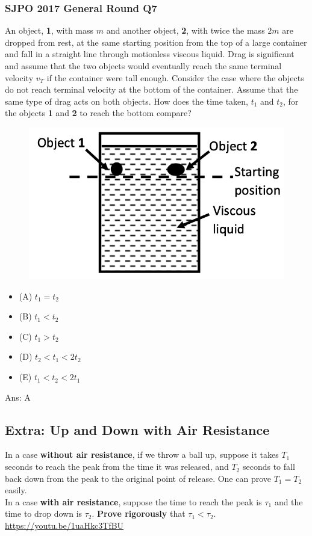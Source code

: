 \documentclass{article}
\begin{document}
\subsubsection{SJPO 2017 General Round Q7}
An object, \textbf{1}, with mass $m$ and another object, \textbf{2}, with twice the mass $2 m$ are dropped from rest, at the same starting position from the top of a large container and fall in a straight line through motionless viscous liquid. Drag is significant and assume that the two objects would eventually reach the same terminal velocity $v_T$ if the container were tall enough. Consider the case where the objects do not reach terminal velocity at the bottom of the container. Assume that the same type of drag acts on both objects. How does the time taken, $t_1$ and $t_2$, for the objects \textbf{1} and \textbf{2} to reach the bottom compare?\\[10pt]
{
 \begin{figure} 
\includegraphics[width=\linewidth]{images/sjpo2016q7.png}
\end{figure}
\begin{itemize}
\item[] (A) $t_1=t_2$
\item[] (B) $t_1<t_2$
\item[] (C) $t_1>t_2$
\item[] (D) $t_2<t_1<2 t_2$
\item[] (E) $t_1<t_2<2 t_1$
\end{itemize}
}
Ans: \ifpaper A \fi


\subsection{Extra: Up and Down with Air Resistance}
In a case \textbf{without air resistance}, if we throw a ball up, suppose it takes $T_1$ seconds to reach the peak from the time it was released, and $T_2$ seconds to fall back down from the peak to the original point of release. One can prove $T_1 = T_2$ easily.\\[10pt]
In a case \textbf{with air resistance},
suppose the time to reach the peak is $\tau_1$ and the time to drop down is $\tau_2$. \textbf{Prove rigorously} that $\tau_1 < \tau_2$.\\[10pt]
\url{https://youtu.be/1uaHkc3TfBU}
\end{document}
